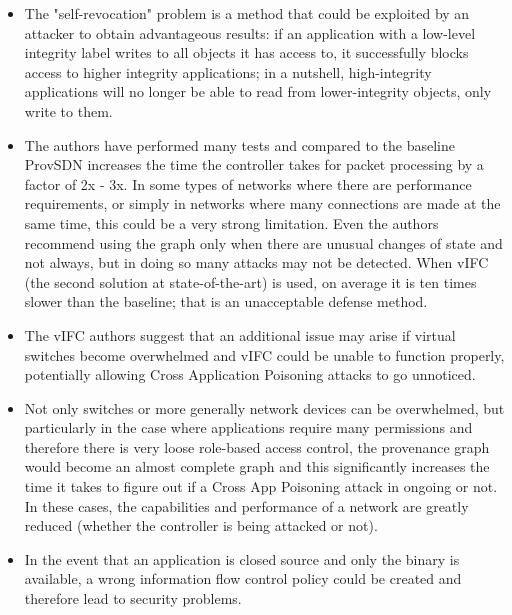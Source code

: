 {\begin{itemize}
\item The "self-revocation" problem is a method that could be exploited by an attacker to obtain advantageous results: if an application with a low-level integrity label writes to all objects it has access to, it successfully blocks access to higher integrity applications; in a nutshell, high-integrity applications will no longer be able to read from lower-integrity objects, only write to them.
\item The authors have performed many tests and compared to the baseline ProvSDN increases the time the controller takes for packet processing by a factor of 2x - 3x. In some types of networks where there are performance requirements, or simply in networks where many connections are made at the same time, this could be a very strong limitation. Even the authors recommend using the graph only when there are unusual changes of state and not always, but in doing so many attacks may not be detected. When vIFC (the second solution at state-of-the-art) is used, on average it is ten times slower than the baseline; that is an unacceptable defense method.
\item The vIFC authors suggest that an additional issue may arise if virtual switches become overwhelmed and vIFC could be unable to function properly, potentially allowing Cross Application Poisoning attacks to go unnoticed.
\item Not only switches or more generally network devices can be overwhelmed, but particularly in the case where applications require many permissions and therefore there is very loose role-based access control, the provenance graph would become an almost complete graph and this significantly increases the time it takes to figure out if a Cross App Poisoning attack in ongoing or not. In these cases, the capabilities and performance of a network are greatly reduced (whether the controller is being attacked or not).
\item In the event that an application is closed source and only the binary is available, a wrong information flow control policy could be created and therefore lead to security problems.
\end{itemize}
\medskip

}

